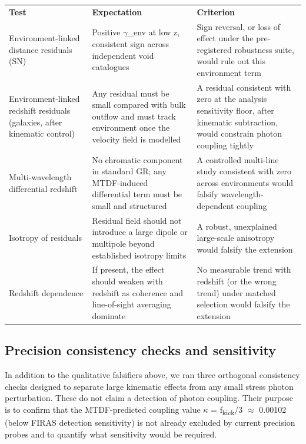 \documentclass[11pt,a4paper]{article}
\begin{document}
\begin{table}[H]
\centering
\footnotesize
\begin{tabularx}{\linewidth}{l>{\RaggedRight\arraybackslash}X>{\RaggedRight\arraybackslash}X}
\toprule
\textbf{Test} & \textbf{Expectation} & \textbf{Criterion} \tabularnewline
Environment-linked distance residuals (SN) & Positive $\gamma$\_\allowbreak{}env at low z, consistent sign across independent void catalogues & Sign reversal, or loss of effect under the pre-registered robustness suite, would rule out this environment term \tabularnewline
Environment-linked redshift residuals (galaxies, after kinematic control) & Any residual must be small compared with bulk outflow and must track environment once the velocity field is modelled & A residual consistent with zero at the analysis sensitivity floor, after kinematic subtraction, would constrain photon coupling tightly \tabularnewline
Multi-wavelength differential redshift & No chromatic component in standard GR; any MTDF-induced differential term must be small and structured & A controlled multi-line study consistent with zero across environments would falsify wavelength-dependent coupling \tabularnewline
Isotropy of residuals & Residual field should not introduce a large dipole or multipole beyond established isotropy limits & A robust, unexplained large-scale anisotropy would falsify the extension \tabularnewline
Redshift dependence & If present, the effect should weaken with redshift as coherence and line-of-sight averaging dominate & No measurable trend with redshift (or the wrong trend) under matched selection would falsify the extension \tabularnewline
\bottomrule
\end{tabularx}
\end{table}

\subsection{Precision consistency checks and sensitivity}
In addition to the qualitative falsifiers above, we ran three orthogonal consistency checks designed to separate large kinematic effects from any small stress photon perturbation. These do not claim a detection of photon coupling. Their purpose is to confirm that the MTDF-predicted coupling value $\kappa$ = f\textsubscript{kick}/3 $\approx$ 0.00102 (below FIRAS detection sensitivity) is not already excluded by current precision probes and to quantify what sensitivity would be required.
\end{document}
